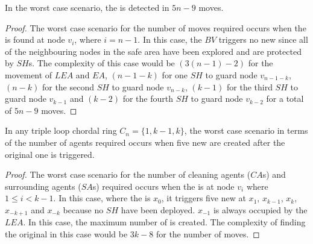 \begin{theorem}
In the worst case scenario, the \bv is detected in $5n-9$ moves.
 
\end{theorem}
\begin{proof}
The worst case scenario for the number of moves required occurs when the \bv  is found at node $v_i$, where $i=n-1$.
  In this case, the $BV$ triggers no new \bvs since all of the neighbouring nodes in the safe area have been explored and are protected by $SH$s.
% 
 The complexity of this case would be $(3(n-1)-2)$ for the movement of $LEA$ and $EA$, $(n-1-k)$ for one $SH$ to guard node $v_{n-1-k}$, $(n-k)$ for the second $SH$ to guard node $v_{n-k}$, $(k-1)$ for the third $SH$ to guard node $v_{k-1}$ and $(k-2)$ for the fourth $SH$ to guard node $v_{k-2}$ for a total of $5n-9$ moves.
\end{proof}
\begin{theorem}
In any triple loop chordal ring $C_n=\{1,k-1,k\}$, the worst case scenario in terms of the number of agents required occurs when five new \bvs are created after the original one is triggered. 
\end{theorem}

\begin{proof}
The worst case scenario for the number of cleaning agents ($CA$s) and surrounding agents ($SA$s) required occurs when the \bv is at node $v_i$ where $ 1\leq i < k-1$. In this case, where the \bv is $x_0$, it  triggers five new \bvs at $x_1$, $x_{k-1}$, $x_k$, $x_{-k+1}$ and $x_{-k}$ because no $SH$ have been deployed. $x_{-1} $ is always occupied by the $LEA$. In this case, the maximum number of \bvs is created.
The complexity of finding the original \bv in this case would be $3k-8$ for the number of moves. 
\end{proof}



